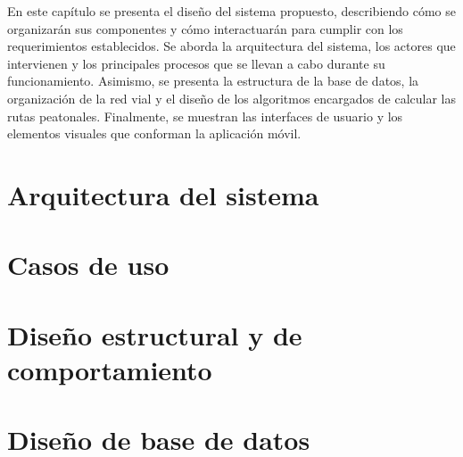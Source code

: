 En este capítulo se presenta el diseño del sistema propuesto, describiendo cómo se organizarán sus componentes y cómo interactuarán para cumplir con los requerimientos establecidos. Se aborda la arquitectura del sistema, los actores que intervienen y los principales procesos que se llevan a cabo durante su funcionamiento. Asimismo, se presenta la estructura de la base de datos, la organización de la red vial y el diseño de los algoritmos encargados de calcular las rutas peatonales. Finalmente, se muestran las interfaces de usuario y los elementos visuales que conforman la aplicación móvil.

\section{Arquitectura del sistema}
\label{sec:arquitectura}


\section{Casos de uso}
\label{sec:casos_uso}


\section{Diseño estructural y de comportamiento}
\label{sec:diseno_estructural}


\section{Diseño de base de datos}
\label{sec:diseno_base_datos}


